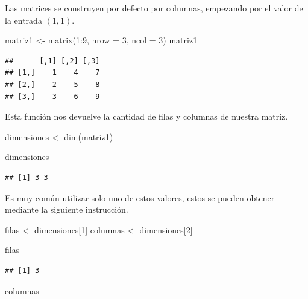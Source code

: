 \documentclass[
  12pt,
]{book}
\newenvironment{Shaded}{\begin{snugshade}}{\end{snugshade}}
\newcommand{\AttributeTok}[1]{\textcolor[rgb]{0.77,0.63,0.00}{#1}}
\newcommand{\DecValTok}[1]{\textcolor[rgb]{0.00,0.00,0.81}{#1}}
\newcommand{\FunctionTok}[1]{\textcolor[rgb]{0.00,0.00,0.00}{#1}}
\newcommand{\NormalTok}[1]{#1}
\newcommand{\OtherTok}[1]{\textcolor[rgb]{0.56,0.35,0.01}{#1}}
\newcommand{\SpecialCharTok}[1]{\textcolor[rgb]{0.00,0.00,0.00}{#1}}
\begin{document}
Las matrices se construyen por defecto por columnas, empezando por el valor de la entrada \((1,1)\).

\begin{Shaded}
\begin{Highlighting}[]
\NormalTok{matriz1 }\OtherTok{\textless{}{-}} \FunctionTok{matrix}\NormalTok{(}\DecValTok{1}\SpecialCharTok{:}\DecValTok{9}\NormalTok{, }\AttributeTok{nrow =} \DecValTok{3}\NormalTok{, }\AttributeTok{ncol =} \DecValTok{3}\NormalTok{)}
\NormalTok{matriz1}
\end{Highlighting}
\end{Shaded}

\begin{verbatim}
##      [,1] [,2] [,3]
## [1,]    1    4    7
## [2,]    2    5    8
## [3,]    3    6    9
\end{verbatim}

Esta función nos devuelve la cantidad de filas y columnas de nuestra matriz.

\begin{Shaded}
\begin{Highlighting}[]
\NormalTok{dimensiones }\OtherTok{\textless{}{-}} \FunctionTok{dim}\NormalTok{(matriz1)}

\NormalTok{dimensiones}
\end{Highlighting}
\end{Shaded}

\begin{verbatim}
## [1] 3 3
\end{verbatim}

Es muy común utilizar solo uno de estos valores, estos se pueden obtener mediante la siguiente instrucción.

\begin{Shaded}
\begin{Highlighting}[]
\NormalTok{filas }\OtherTok{\textless{}{-}}\NormalTok{  dimensiones[}\DecValTok{1}\NormalTok{]}
\NormalTok{columnas }\OtherTok{\textless{}{-}}\NormalTok{ dimensiones[}\DecValTok{2}\NormalTok{]}

\NormalTok{filas}
\end{Highlighting}
\end{Shaded}

\begin{verbatim}
## [1] 3
\end{verbatim}

\begin{Shaded}
\begin{Highlighting}[]
\NormalTok{columnas}
\end{Highlighting}
\end{Shaded}
\end{document}
